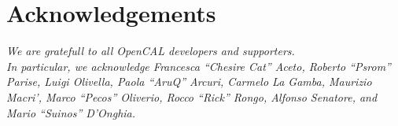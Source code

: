 \chapter*{Acknowledgements}


\emph{We are gratefull to all OpenCAL developers and supporters.\\
  In particular, we acknowledge Francesca ``Chesire Cat''
  Aceto, Roberto ``Psrom'' Parise, Luigi Olivella, Paola ``AruQ'' Arcuri, Carmelo La Gamba, Maurizio
  Macri', Marco ``Pecos'' Oliverio, Rocco ``Rick'' Rongo, Alfonso Senatore, and
  Mario ``Suinos'' D'Onghia.}

\newpage

